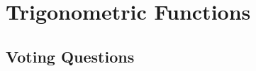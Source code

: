 \section{Trigonometric Functions} \label{S.0.5.TrigFunctions}


\newpage

\newpage

\newpage

\newpage

\subsection*{Voting Questions}

\newpage
